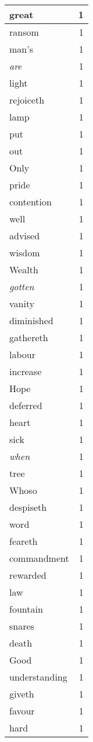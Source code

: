 \begin{center}
\begin{longtable}{l|r}
great & 1\\ \hline 
ransom & 1\\ \hline 
man's & 1\\ \hline 
\emph{are} & 1\\ \hline 
light & 1\\ \hline 
rejoiceth & 1\\ \hline 
lamp & 1\\ \hline 
put & 1\\ \hline 
out & 1\\ \hline 
Only & 1\\ \hline 
pride & 1\\ \hline 
contention & 1\\ \hline 
well & 1\\ \hline 
advised & 1\\ \hline 
wisdom & 1\\ \hline 
Wealth & 1\\ \hline 
\emph{gotten} & 1\\ \hline 
vanity & 1\\ \hline 
diminished & 1\\ \hline 
gathereth & 1\\ \hline 
labour & 1\\ \hline 
increase & 1\\ \hline 
Hope & 1\\ \hline 
deferred & 1\\ \hline 
heart & 1\\ \hline 
sick & 1\\ \hline 
\emph{when} & 1\\ \hline 
tree & 1\\ \hline 
Whoso & 1\\ \hline 
despiseth & 1\\ \hline 
word & 1\\ \hline 
feareth & 1\\ \hline 
commandment & 1\\ \hline 
rewarded & 1\\ \hline 
law & 1\\ \hline 
fountain & 1\\ \hline 
snares & 1\\ \hline 
death & 1\\ \hline 
Good & 1\\ \hline 
understanding & 1\\ \hline 
giveth & 1\\ \hline 
favour & 1\\ \hline 
hard & 1\\ \hline 

\end{longtable}
\end{center}
